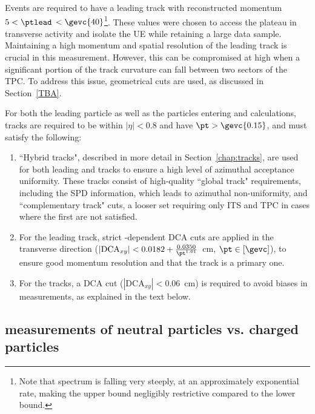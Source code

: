 Events are required to have a leading track with reconstructed momentum $5 < \ptlead$ $< \gevc{40}$\footnote{Note that \pt spectrum is falling very steeply, at an approximately exponential rate, making the upper bound negligibly restrictive compared to the lower bound.}. These values were chosen to access the plateau in transverse activity and isolate the UE while retaining a large data sample. Maintaining a high momentum and spatial resolution of the leading track is crucial in this measurement. However, this can be compromised at high \pt when a significant portion of the track curvature can fall between two sectors of the TPC. To address this issue, geometrical cuts are used, as discussed in Section~\ref{TBA}.

For both the leading particle as well as the particles entering \NT and \RT calculations, tracks are required to be within $|\eta|<0.8$ and have $\pt > \gevc{0.15}$, and must satisfy the following:
\begin{enumerate}
\item ``Hybrid tracks", described in more detail in Section~\ref{chap:tracks}, are used for both leading and \NT tracks to ensure a high level of azimuthal acceptance uniformity. These tracks consist of high-quality ``global track" requirements, including the SPD information, which leads to azimuthal non-uniformity, and ``complementary track" cuts, a looser set requiring only ITS and TPC in cases where the first are not satisfied.
\item  For the leading track, strict \pt-dependent DCA cuts are applied in the transverse direction ($|\mathrm{DCA}_{xy}| < 0.0182 + \frac{0.0350}{\pt^{1.01}}$~cm, $\pt \in [ \mathrm{\gevc} ]$), to ensure good momentum resolution and that the track is a primary one.
\item For the \NT tracks, a DCA cut ($|\mathrm{DCA}_{xy}| < 0.06$~cm) is required to avoid biases in \VO measurements, as explained in the text below.
\end{enumerate}

\subsection{\RT measurements of neutral particles vs. charged particles}

